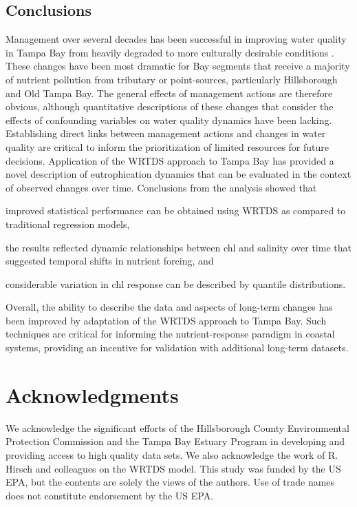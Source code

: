 \documentclass[letterpaper,12pt,oneside]{article}\usepackage[]{graphicx}\usepackage[]{color}
\begin{document}
\subsection{Conclusions}

Management over several decades has been successful in improving water quality in Tampa Bay from heavily degraded to more culturally desirable conditions \citep{Greening06}.  These changes have been most dramatic for Bay segments that receive a majority of nutrient pollution from tributary or point-sources, particularly Hillsborough and Old Tampa Bay.  The general effects of management actions are therefore obvious, although quantitative descriptions of these changes that consider the effects of confounding variables on water quality dynamics have been lacking.  Establishing direct links between management actions and changes in water quality are critical to inform the prioritization of limited resources for future decisions.  Application of the \ac{WRTDS} approach to Tampa Bay has provided a novel description of eutrophication dynamics that can be evaluated in the context of observed changes over time.  Conclusions from the analysis showed that\begin{inparaenum}[1\upshape)]
\item improved statistical performance can be obtained using \ac{WRTDS} as compared to traditional regression models,
\item the results reflected dynamic relationships between \ac{chl} and salinity over time that suggested temporal shifts in nutrient forcing, and 
\item considerable variation in \ac{chl} response can be described by quantile distributions.
\end{inparaenum}
Overall, the ability to describe the data and aspects of long-term changes has been improved by adaptation of the \ac{WRTDS} approach to Tampa Bay. Such techniques are critical for informing the nutrient-response paradigm in coastal systems, providing an incentive for validation with additional long-term datasets.

\section*{Acknowledgments}

We acknowledge the significant efforts of the Hillsborough County Environmental Protection Commission and the Tampa Bay Estuary Program in developing and providing access to high quality data sets.  We also acknowledge the work of R. Hirsch and colleagues on the \ac{WRTDS} model. This study was funded by the US \ac{EPA}, but the contents are solely the views of the authors.  Use of trade names does not constitute endorsement by the US \ac{EPA}.
\end{document}
